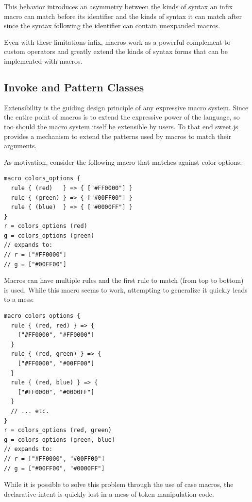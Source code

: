 \documentclass[9pt]{sigplanconf}
\begin{document}
This behavior introduces an asymmetry between the kinds of syntax an
infix macro can match before its identifier and the kinds of syntax it
can match after since the syntax following the identifier can contain
unexpanded macros.

Even with these limitations infix, macros work as a powerful complement
to custom operators and greatly extend the kinds of syntax forms
that can be implemented with macros.

\subsection{Invoke and Pattern Classes}
\label{sec:invoke}

Extensibility is the guiding design principle of any expressive macro
system. Since the entire point of macros is to extend the expressive
power of the language, so too should the macro system itself be
extensible by users. To that end sweet.js provides a mechanism to
extend the patterns used by macros to match their arguments.

As motivation, consider the following macro that matches against
color options:
\begin{lstlisting}
macro colors_options {
  rule { (red)   } => { ["#FF0000"] }
  rule { (green) } => { ["#00FF00"] }
  rule { (blue)  } => { ["#0000FF"] }
}
r = colors_options (red)
g = colors_options (green)
// expands to:
// r = ["#FF0000"]
// g = ["#00FF00"]
\end{lstlisting}
Macros can have multiple rules and the first rule to match (from top
to bottom) is used. While this macro seems to work, attempting to
generalize it quickly leads to a mess:
\begin{lstlisting}
macro colors_options {
  rule { (red, red) } => {
    ["#FF0000", "#FF0000"]
  }
  rule { (red, green) } => {
    ["#FF0000", "#00FF00"]
  }
  rule { (red, blue) } => {
    ["#FF0000", "#0000FF"]
  }
  // ... etc.
}
r = colors_options (red, green)
g = colors_options (green, blue)
// expands to:
// r = ["#FF0000", "#00FF00"]
// g = ["#00FF00", "#0000FF"]
\end{lstlisting}
While it is possible to solve this problem through the use of case
macros, the declarative intent is quickly lost in a mess of 
token manipulation code.
\end{document}
